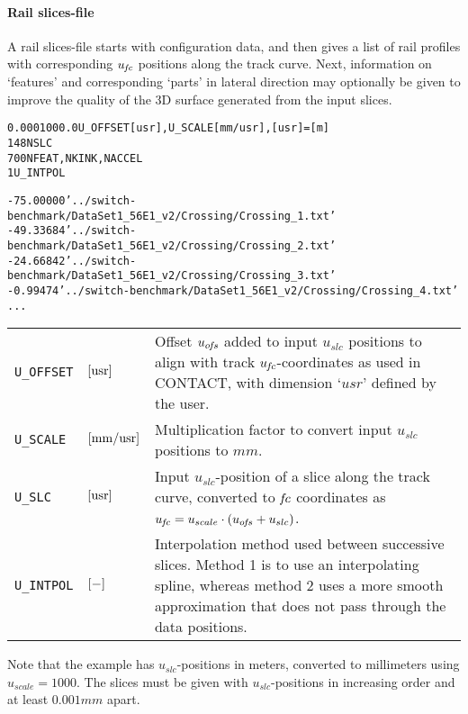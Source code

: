 \documentclass[12pt]{report}
\renewcommand{\magenta}[1]{}
\newenvironment{inputvars}{\vspace{0.4\baselineskip}%

\begin{tabular}{>{\raggedright}p{22mm}p{19mm}p{113mm}}}{
\end{tabular}

}
\newcommand{\inpvar}[3]{{\small\tt #1} & $#2$ & #3 \\[1ex]}
\newcommand{\inpbreak}{\end{inputvars}\begin{inputvars}}
\begin{document}
\paragraph{Rail slices-file}

A rail slices-file starts with configuration data, and then gives a list of
rail profiles with corresponding $u_{\mkern-2muf\mkern-2muc}$ positions along the track curve.
Next, information on `features' and corresponding `parts' in lateral
direction may optionally be given to improve the quality of the 3D surface
generated from the input slices. 
\magenta{Lastly, perturbations may be prescribed to be added to the
surface, used primarily to describe rail corrugation and wheel
polygonization.}
\begin{alltt}\small
% data for S+C benchmark, UK crossing '56E1-R245-1:9.25'

   0.000    1000.0   U_OFFSET [usr], U_SCALE [mm/usr], [usr] = [m]
     148             NSLC
       7    0    0   NFEAT, NKINK, NACCEL
       1    \magenta{0}         U_INTPOL\magenta{, PERTURB}

%  - slice positions U_SLC [usr] and filenames RFNAME per slice

 -75.00000   '../switch-benchmark/DataSet1_56E1_v2/Crossing/Crossing_1.txt'
 -49.33684   '../switch-benchmark/DataSet1_56E1_v2/Crossing/Crossing_2.txt'
 -24.66842   '../switch-benchmark/DataSet1_56E1_v2/Crossing/Crossing_3.txt'
  -0.99474   '../switch-benchmark/DataSet1_56E1_v2/Crossing/Crossing_4.txt'
          ...
\end{alltt}
\begin{inputvars}
\inpvar{U\_OFFSET}{\bunit{usr}}{Offset $u_{o\mkern-2muf\mkern-2mus}$ added to input $u_{slc}$
        positions to align with track $u_{\mkern-2muf\mkern-2muc}$-coordinates as used in
        CONTACT, with dimension `$\unit{usr}$' defined by the user.}
\inpvar{U\_SCALE}{\bunit{mm/usr}}{Multiplication factor to convert input
        $u_{slc}$ positions to $\unit{mm}$.}
\inpvar{U\_SLC}{\bunit{usr}}{Input $u_{slc}$-position of a slice along the
        track curve, converted to $\mkern-2muf\mkern-2muc$ coordinates as $u_{\mkern-2muf\mkern-2muc} = u_{scale}
        \cdot (u_{o\mkern-2muf\mkern-2mus} + u_{slc})$.}
\inpvar{U\_INTPOL}{\bunit{-}}{Interpolation method used between successive
        slices. Method 1 is to use an interpolating spline, whereas method
        2 uses a more smooth approximation that does not pass through the
        data positions.}
\end{inputvars}
Note that the example has $u_{slc}$-positions in meters, converted to
millimeters using $u_{scale}=1000$. The slices must be given with
$u_{slc}$-positions in increasing order and at least $0.001\unit{mm}$ apart.
\end{document}
